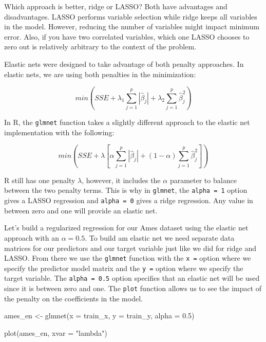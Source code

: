 \documentclass[
  letterpaper,
  DIV=11,
  numbers=noendperiod]{scrreprt}
\newenvironment{Shaded}{\begin{snugshade}}{\end{snugshade}}
\newcommand{\AttributeTok}[1]{\textcolor[rgb]{0.40,0.45,0.13}{#1}}
\newcommand{\FloatTok}[1]{\textcolor[rgb]{0.68,0.00,0.00}{#1}}
\newcommand{\FunctionTok}[1]{\textcolor[rgb]{0.28,0.35,0.67}{#1}}
\newcommand{\NormalTok}[1]{\textcolor[rgb]{0.00,0.23,0.31}{#1}}
\newcommand{\OtherTok}[1]{\textcolor[rgb]{0.00,0.23,0.31}{#1}}
\newcommand{\StringTok}[1]{\textcolor[rgb]{0.13,0.47,0.30}{#1}}
\begin{document}
Which approach is better, ridge or LASSO? Both have advantages and
disadvantages. LASSO performs variable selection while ridge keeps all
variables in the model. However, reducing the number of variables might
impact minimum error. Also, if you have two correlated variables, which
one LASSO chooses to zero out is relatively arbitrary to the context of
the problem.

Elastic nets were designed to take advantage of both penalty approaches.
In elastic nets, we are using both penalties in the minimization:

\[
min(SSE + \lambda_1 \sum_{j=1}^p |\hat{\beta}_j| + \lambda_2 \sum_{j=1}^p \hat{\beta}^2_j) 
\]

In R, the \texttt{glmnet} function takes a slightly different approach
to the elastic net implementation with the following:

\[
min(SSE + \lambda[ \alpha \sum_{j=1}^p |\hat{\beta}_j| + (1-\alpha) \sum_{j=1}^p \hat{\beta}^2_j]) 
\]

R still has one penalty \(\lambda\), however, it includes the \(\alpha\)
parameter to balance between the two penalty terms. This is why in
\texttt{glmnet}, the \texttt{alpha\ =\ 1} option gives a LASSO
regression and \texttt{alpha\ =\ 0} gives a ridge regression. Any value
in between zero and one will provide an elastic net.

Let's build a regularized regression for our Ames dataset using the
elastic net approach with an \(\alpha = 0.5\). To build am elastic net
we need separate data matrices for our predictors and our target
variable just like we did for ridge and LASSO. From there we use the
\texttt{glmnet} function with the \texttt{x\ =} option where we specify
the predictor model matrix and the \texttt{y\ =} option where we specify
the target variable. The \texttt{alpha\ =\ 0.5} option specifies that an
elastic net will be used since it is between zero and one. The
\texttt{plot} function allows us to see the impact of the penalty on the
coefficients in the model.

\begin{Shaded}
\begin{Highlighting}[]
\NormalTok{ames\_en }\OtherTok{\textless{}{-}} \FunctionTok{glmnet}\NormalTok{(}\AttributeTok{x =}\NormalTok{ train\_x,  }\AttributeTok{y =}\NormalTok{ train\_y,  }\AttributeTok{alpha =} \FloatTok{0.5}\NormalTok{)}

\FunctionTok{plot}\NormalTok{(ames\_en, }\AttributeTok{xvar =} \StringTok{"lambda"}\NormalTok{)}
\end{Highlighting}
\end{Shaded}
\end{document}
